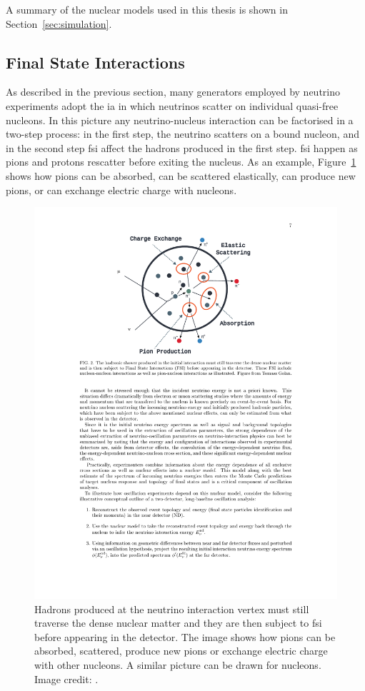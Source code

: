 A summary of the nuclear models used in this thesis is shown in Section~\ref{sec:simulation}.



\subsection{Final State Interactions}

As described in the previous section, many generators employed by neutrino experiments adopt the \acrshort{ia} in which neutrinos scatter on individual quasi-free nucleons. In this picture any neutrino-nucleus interaction can be factorised in a two-step process: in the first step, the neutrino scatters on a bound nucleon, and in the second step \acrfull{fsi} affect the hadrons produced in the first step. \acrshort{fsi} happen as pions and protons rescatter before exiting the nucleus. As an example, Figure~\ref{fig:fsi} shows how pions can be absorbed, can be scattered elastically, can produce new pions, or can exchange electric charge with nucleons.

\begin{figure}[]
\centering
\includegraphics[width=.50\textwidth]{images/NeutrinoInteractions/fsi}
\caption[Cartoon of Final State Effects]{Hadrons produced at the neutrino interaction vertex must still traverse the dense nuclear matter and they are then subject to \acrshort{fsi} before appearing in the detector. The image shows how pions can be absorbed, scattered, produce new pions or exchange electric charge with other nucleons. A similar picture can be drawn for nucleons. Image credit: \cite{golan_thesis}.}
\label{fig:fsi}
\end{figure}

